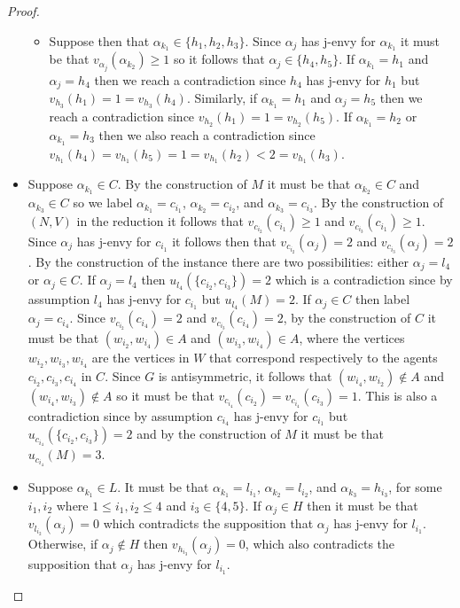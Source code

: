 \begin{proof}
\begin{itemize}
\begin{itemize}
    \item Suppose then that $\alpha_{k_1} \in \{ h_1, h_2, h_3 \}$. Since $\alpha_j$ has j-envy for $\alpha_{k_1}$ it must be that $v_{\alpha_j}(\alpha_{k_2}) \geq 1$ so it follows that $\alpha_j \in \{ h_4, h_5 \}$. If $\alpha_{k_1} = h_1$ and $\alpha_j = h_4$ then we reach a contradiction since $h_4$ has j-envy for $h_1$ but $v_{h_3}(h_1) = 1 = v_{h_3}(h_4)$. Similarly, if $\alpha_{k_1} = h_1$ and $\alpha_j = h_5$ then we reach a contradiction since $v_{h_2}(h_1) = 1 = v_{h_2}(h_5)$. If $\alpha_{k_1} = h_2$ or $\alpha_{k_1} = h_3$ then we also reach a contradiction since $v_{h_1}(h_4) = v_{h_1}(h_5) = 1 = v_{h_1}(h_2) < 2 = v_{h_1}(h_3)$.
    \end{itemize}
    
    \item Suppose $\alpha_{k_1} \in C$. By the construction of $M$ it must be that $\alpha_{k_2} \in C$ and $\alpha_{k_3} \in C$ so we label $\alpha_{k_1} = c_{i_1}$, $\alpha_{k_2} = c_{i_2}$, and $\alpha_{k_3} = c_{i_3}$. By the construction of $(N, V)$ in the reduction it follows that $v_{c_{i_2}}(c_{i_1}) \geq 1$ and $v_{c_{i_3}}(c_{i_1}) \geq 1$. Since $\alpha_j$ has j-envy for $c_{i_1}$ it follows then that $v_{c_{i_2}}(\alpha_j) = 2$ and $v_{c_{i_3}}(\alpha_j) = 2$. By the construction of the instance there are two possibilities: either $\alpha_j = l_4$ or $\alpha_j \in C$. If $\alpha_j = l_4$ then $u_{l_4}(\{ c_{i_2}, c_{i_3} \}) = 2$ which is a contradiction since by assumption $l_4$ has j-envy for $c_{i_1}$ but $u_{l_4}(M) = 2$. If $\alpha_j \in C$ then label $\alpha_j = c_{i_4}$. Since $v_{c_{i_2}}(c_{i_4}) = 2$ and $v_{c_{i_3}}(c_{i_4}) = 2$, by the construction of $C$ it must be that $( w_{i_2}, w_{i_4} ) \in A$ and $( w_{i_3}, w_{i_4} ) \in A$, where the vertices $w_{i_2}, w_{i_3}, w_{i_4}$ are the vertices in $W$ that correspond respectively to the agents $c_{i_2}, c_{i_3}, c_{i_4}$ in $C$. Since $G$ is antisymmetric, it follows that $( w_{i_4}, w_{i_2} ) \notin A$ and $( w_{i_4}, w_{i_3} ) \notin A$ so it must be that $v_{c_{i_4}}(c_{i_2}) = v_{c_{i_4}}(c_{i_3}) = 1$. This is also a contradiction since by assumption $c_{i_4}$ has j-envy for $c_{i_1}$ but $u_{c_{i_4}}(\{ c_{i_2}, c_{i_3} \}) = 2$ and by the construction of $M$ it must be that $u_{c_{i_4}}(M) = 3$.
    
    \item Suppose $\alpha_{k_1} \in L$. It must be that $\alpha_{k_1} = l_{i_1}$, $\alpha_{k_2} = l_{i_2}$, and $\alpha_{k_3} = h_{i_3}$, for some $i_1, i_2$ where $1 \leq i_1, i_2 \leq 4$ and $i_3 \in \{ 4, 5 \}$. If $\alpha_j \in H$ then it must be that $v_{l_{i_2}}(\alpha_j) = 0$ which contradicts the supposition that $\alpha_j$ has j-envy for $l_{i_1}$. Otherwise, if $\alpha_j \notin H$ then $v_{h_{i_3}}(\alpha_j) = 0$, which also contradicts the supposition that $\alpha_j$ has j-envy for $l_{i_1}$.
\end{itemize}
\end{proof}

